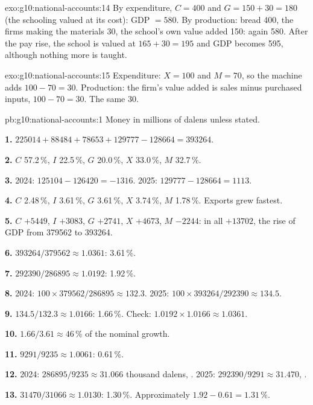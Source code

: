 \begin{solution}{exo:g10:national-accounts:14}
By expenditure, $C = 400$ and $G = 150 + 30 = 180$ (the schooling valued at its cost): GDP $= 580$. By production: bread 400, the firms making the materials 30, the school's own
value added 150: again 580. After the pay rise, the school is valued at $165 + 30 = 195$ and GDP becomes 595, although nothing more is taught.
\end{solution}

\begin{solution}{exo:g10:national-accounts:15}
Expenditure: $X = 100$ and $M = 70$, so the machine adds $100 - 70 = 30$. Production: the firm's value added is sales minus purchased inputs, $100 - 70 = 30$. The same 30.
\end{solution}

\begin{solution}{pb:g10:national-accounts:1}
Money in millions of dalens unless stated.

\textbf{1.} $225014 + 88484 + 78653 + 129777 - 128664 = 393264$.

\textbf{2.} $C$ 57.2\,\%, $I$ 22.5\,\%, $G$ 20.0\,\%, $X$ 33.0\,\%, $M$ 32.7\,\%.

\textbf{3.} 2024: $125104 - 126420 = -1316$. 2025: $129777 - 128664 = 1113$.

\textbf{4.} $C$ 2.48\,\%, $I$ 3.61\,\%, $G$ 3.61\,\%, $X$ 3.74\,\%, $M$ 1.78\,\%. Exports grew fastest.

\textbf{5.} $C$ $+5449$, $I$ $+3083$, $G$ $+2741$, $X$ $+4673$, $M$ $-2244$: in all $+13702$, the rise of GDP from \num{379562} to \num{393264}.

\textbf{6.} $393264/379562 \approx 1.0361$: 3.61\,\%.

\textbf{7.} $292390/286895 \approx 1.0192$: 1.92\,\%.

\textbf{8.} 2024: $100 \times 379562/286895 \approx 132.3$. 2025: $100 \times 393264/292390 \approx 134.5$.

\textbf{9.} $134.5/132.3 \approx 1.0166$: 1.66\,\%. Check: $1.0192 \times 1.0166 \approx 1.0361$.

\textbf{10.} $1.66/3.61 \approx 46\,\%$ of the nominal growth.

\textbf{11.} $9291/9235 \approx 1.0061$: 0.61\,\%.

\textbf{12.} 2024: $286895/9235 \approx 31.066$ thousand dalens, . 2025: $292390/9291 \approx 31.470$, .

\textbf{13.} $31470/31066 \approx 1.0130$: 1.30\,\%. Approximately $1.92 - 0.61 = 1.31\,\%$.


\end{solution}
